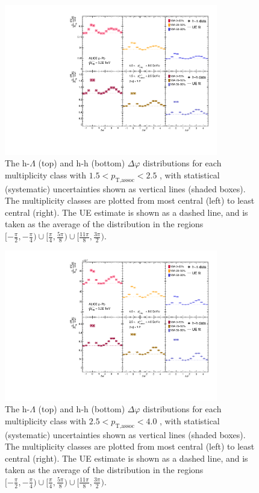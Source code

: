 \begin{figure}[h!]
\centering
\includegraphics[width=0.83\textwidth]{figures/results/dphi_final_lowpt.pdf}
\caption{The h-$\Lambda$ (top) and h-h (bottom) $\Delta\varphi$ distributions for each multiplicity class with $1.5 < p_{\text{T,assoc}} < 2.5$ \GeVc, with statistical (systematic) uncertainties shown as vertical lines (shaded boxes). The multiplicity classes are plotted from most central (left) to least central (right). The UE estimate is shown as a dashed line, and is taken as the average of the distribution in the regions $[-\frac{\pi}{2}, -\frac{\pi}{4}) \cup [\frac{\pi}{4}, \frac{5\pi}{8}) \cup [\frac{11\pi}{8}, \frac{3\pi}{2})$.}
\label{fig:dphi_final_lowpt}
\end{figure}

\begin{figure}[h!]
\centering
\includegraphics[width=0.83\textwidth]{figures/results/dphi_final_highpt.pdf}
\caption{The h-$\Lambda$ (top) and h-h (bottom) $\Delta\varphi$ distributions for each multiplicity class with $2.5 < p_{\text{T,assoc}} < 4.0$ \GeVc, with statistical (systematic) uncertainties shown as vertical lines (shaded boxes). The multiplicity classes are plotted from most central (left) to least central (right). The UE estimate is shown as a dashed line, and is taken as the average of the distribution in the regions $[-\frac{\pi}{2}, -\frac{\pi}{4}) \cup [\frac{\pi}{4}, \frac{5\pi}{8}) \cup [\frac{11\pi}{8}, \frac{3\pi}{2})$.}
\label{fig:dphi_final_highpt}
\end{figure}


